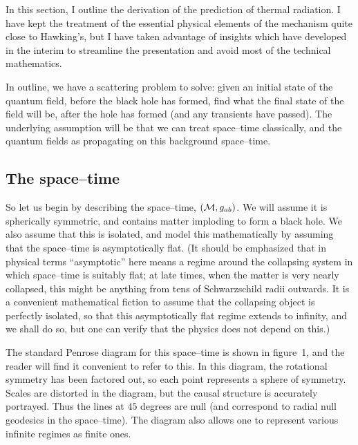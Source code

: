 In this section, I outline the derivation of the prediction of thermal
radiation.  I have kept the treatment of the essential physical elements of the
mechanism quite close to Hawking's, but I have taken advantage of insights
which have developed in the interim to streamline the presentation and avoid
most of the technical mathematics.

In outline, we have a scattering problem to solve:  given an initial
state of the quantum field, before the black hole has formed, find
what the final state of the field will be, after the hole has formed
(and any transients have passed).  The underlying assumption will be
that we can treat space--time classically, and the quantum fields as
propagating on this background space--time. 

\subsection{The space--time}

So let us begin by describing the space--time, $({\cal M}, g_{ab})$.
We will assume it is spherically symmetric, and contains matter
imploding to form a black hole.  We also assume that this is isolated,
and model this mathematically by assuming that the space--time is
asymptotically flat.  (It should be emphasized that in physical terms
``asymptotic'' here means a regime around the collapsing system in
which space--time is suitably flat; at late times, when the matter is
very nearly collapsed, this might be anything from tens of
Schwarzschild radii outwards.  It is a convenient mathematical fiction
to assume that the collapsing object is perfectly isolated, so that
this asymptotically flat regime extends to infinity, and we shall do
so, but one can verify that the physics does not depend on this.)

\bigskip\bigskip
\epsfysize=3in
\centerline{}
\bigskip

The standard Penrose diagram for this space--time is shown in
figure~1, and the reader will find it convenient to refer to this.  In
this diagram, the rotational symmetry has been factored out, so each
point represents a sphere of symmetry.  Scales are distorted in the
diagram, but the causal structure is accurately portrayed.  Thus the
lines at $45$ degrees are null (and correspond to radial null geodesics
in the space--time).  The diagram also allows one to represent various
infinite regimes as finite ones. 

